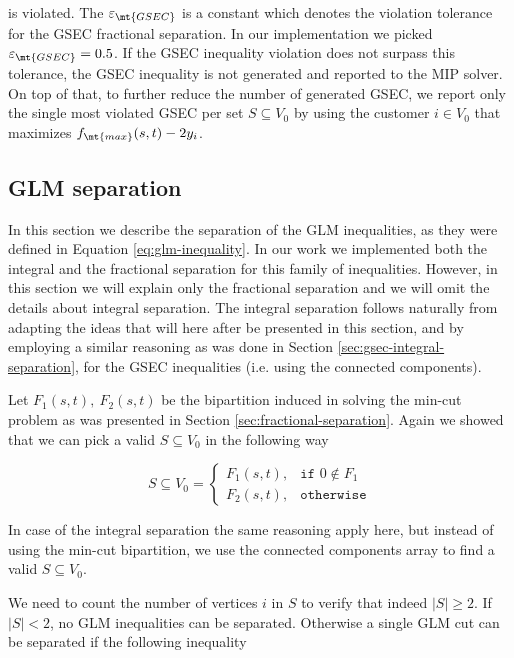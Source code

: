 is violated.
The $\varepsilon_{\mt{GSEC}}$ is a constant which denotes the violation tolerance for the GSEC fractional separation.
In our implementation we picked $\varepsilon_{\mt{GSEC}} = 0.5$.
If the GSEC inequality violation does not surpass this tolerance, the GSEC inequality is not generated and reported to the MIP solver.
On top of that, to further reduce the number of generated GSEC, we report only the single most violated GSEC per set $S \subseteq V_0$ by using the customer $i \in V_0$ that maximizes $f_{\mt{max}}(s, t) - 2 y_i$.


\subsection{GLM separation}\label{sec:glm-separation}
In this section we describe the separation of the GLM inequalities, as they were defined in Equation \eqref{eq:glm-inequality}.
In our work we implemented both the integral and the fractional separation for this family of inequalities.
However, in this section we will explain only the fractional separation and we will omit the details about integral separation.
The integral separation follows naturally from adapting the ideas that will here after be presented in this section, and by employing a similar reasoning as was done in Section \ref{sec:gsec-integral-separation}, for the GSEC inequalities (i.e. using the connected components).

Let $F_1(s, t),\ F_2(s, t)$ be the bipartition induced in solving the min-cut problem as was presented in Section \ref{sec:fractional-separation}.
Again we showed that we can pick a valid $S \subseteq V_0$ in the following way

\begin{equation}
	S \subseteq V_0 =
	\begin{cases}
		F_1(s, t), & \texttt{if } 0 \notin F_1 \\
		F_2(s, t), & \texttt{otherwise}
	\end{cases}
\end{equation}

In case of the integral separation the same reasoning apply here, but instead of using the min-cut bipartition, we use the connected components array to find a valid $S \subseteq V_0$.

We need to count the number of vertices $i$ in $S$ to verify that indeed $|S| \ge 2$.
If $|S| < 2$, no GLM inequalities can be separated.
Otherwise a single GLM cut can be separated if the following inequality

